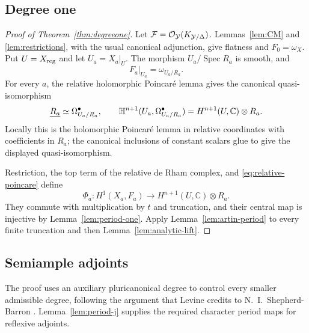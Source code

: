 \documentclass[11pt,a4paper]{article}
\numberwithin{equation}{section}
\theoremstyle{definition}
\theoremstyle{remark}
\newcommand{\C}{\mathbb C}\newcommand{\Z}{\mathbb Z}
\newcommand{\OO}{\mathcal O}\newcommand{\cX}{\mathcal X}
\newcommand{\cY}{\mathcal Y}\newcommand{\cB}{\mathcal B}
\newcommand{\Spec}{\operatorname{Spec}}\newcommand{\vol}{\operatorname{vol}}
\begin{document}
\subsection{Degree one}

\begin{proof}[Proof of Theorem~\ref{thm:degreeone}]
Let $\cF=\OO_{\cY}(K_{\cY/\Delta})$. Lemmas~\ref{lem:CM} and
\ref{lem:restrictions}, with the usual canonical adjunction, give
flatness and $F_0=\omega_X$. Put $U=X_{\mathrm{reg}}$ and let $U_a=X_a|_U$.
The morphism $U_a/\Spec R_a$ is smooth, and
\[
 F_a|_{U_a}=\omega_{U_a/R_a}.
\]
For every $a$, the relative holomorphic Poincaré lemma gives the
canonical quasi-isomorphism
\begin{equation}\label{eq:relative-poincare}
 \underline{R_a}\simeq\Omega^\bullet_{U_a/R_a},\qquad
 \HH^{n+1}(U_a,\Omega^\bullet_{U_a/R_a})
 =H^{n+1}(U,\C)\otimes R_a.
\end{equation}
Locally this is the holomorphic Poincaré lemma in relative coordinates
with coefficients in $R_a$; the canonical inclusions of constant scalars
glue to give the displayed quasi-isomorphism.

Restriction, the top term of the relative de Rham complex, and
\eqref{eq:relative-poincare} define
\[
 \Phi_a:H^1(X_a,F_a)\longrightarrow H^{n+1}(U,\C)\otimes R_a.
\]
They commute with multiplication by $t$ and truncation, and their central
map is injective by Lemma~\ref{lem:period-one}. Apply
Lemma~\ref{lem:artin-period} to every finite truncation and then
Lemma~\ref{lem:analytic-lift}.
\end{proof}

\subsection{Semiample adjoints}

The proof uses an auxiliary pluricanonical degree to control every
smaller admissible degree, following the argument that Levine credits
to N.~I.~Shepherd-Barron \cite[Corollary~1.8]{Levine1983}.
Lemma~\ref{lem:period-j} supplies the required character period maps
for reflexive adjoints.
\end{document}
